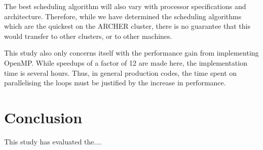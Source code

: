 \documentclass{article} %
\begin{document}
The best scheduling algorithm will also vary with processor specifications and architecture.
Therefore, while we have determined the scheduling algorithms which are the quickest on the ARCHER cluster, there is no guarantee that this would transfer to other clusters, or to other machines.

This study also only concerns itself with the performance gain from implementing OpenMP.
While speedups of a factor of 12 are made here, the implementation time is several hours.
Thus, in general production codes, the time spent on parallelising the loops must be justified by the increase in performance.

\section*{Conclusion}

This study has evaluated the....



\newpage

\end{document}
